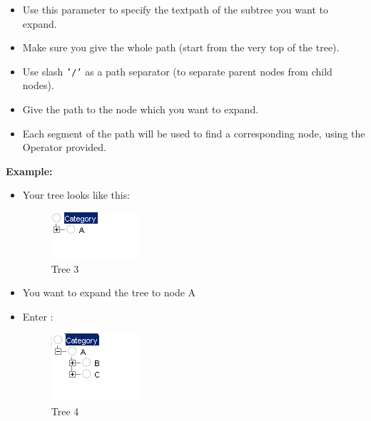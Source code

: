 \begin{itemize}
\item Use this parameter to specify the textpath of the subtree you want to expand.
\item Make sure you give the whole path (start from the very top of the tree).
\item Use slash {\tt '/'} as a path separator (to separate parent nodes from child nodes). 
\item Give the path to the node which you want to expand.
\item Each segment of the path will be used to find a corresponding node, using the Operator provided.
\end{itemize}

\textbf{Example:}

\begin{itemize}
\item Your tree looks like this:

\begin{figure}
\begin{center}
\includegraphics{PS/Treeexample3}
\caption{Tree 3}
\label{treeexample3}
\end{center}
\end{figure}

\item You want to expand the tree to node A
\item Enter :

\begin{figure}
\begin{center}
\includegraphics{PS/Treeexample4}
\caption{Tree 4}
\label{treeexample4}
\end{center}
\end{figure}
\end{itemize}

